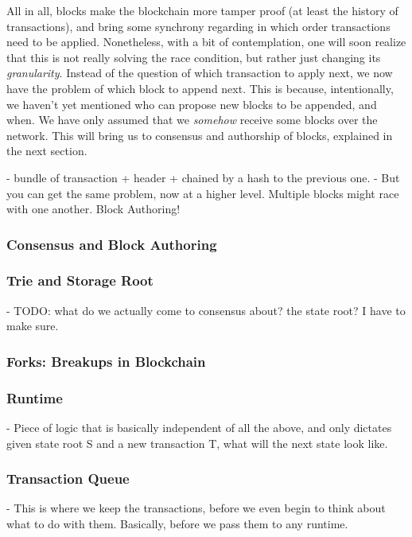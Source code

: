 All in all, blocks make the blockchain more tamper proof (at least the history of transactions), and
bring some synchrony regarding in which order transactions need to be applied. Nonetheless, with a
bit of contemplation, one will soon realize that this is not really solving the race condition, but
rather just changing its \textit{granularity}. Instead of the question of which transaction to apply
next, we now have the problem of which block to append next. This is because, intentionally, we
haven't yet mentioned who can propose new blocks to be appended, and when. We have only assumed that
we \textit{somehow} receive some blocks over the network. This will bring us to consensus and
authorship of blocks, explained in the next section.


- bundle of transaction + header + chained by a hash to the previous one. - But you can get the same
problem, now at a higher level. Multiple blocks might race with one another. Block Authoring!

\subsubsection{Consensus and Block Authoring} \label{chap_bg:subsec:consensus_authorship}

\subsubsection{Trie and Storage Root}

- TODO: what do we actually come to consensus about? the state root? I have to make sure.

\subsubsection{Forks: Breakups in Blockchain}

\subsubsection{Runtime}

- Piece of logic that is basically independent of all the above, and only dictates given state root
S and a new transaction T, what will the next state look like.

\subsubsection{Transaction Queue}

- This is where we keep the transactions, before we even begin to think about what to do with them.
Basically, before we pass them to any runtime.

